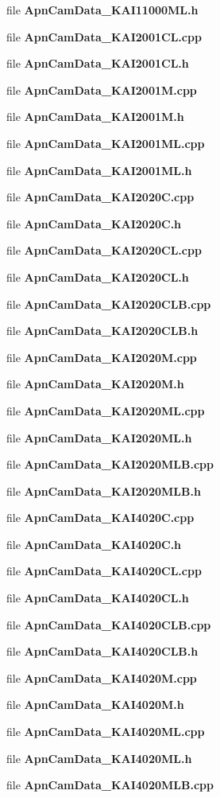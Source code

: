 \begin{CompactItemize}
file {\bf Apn\-Cam\-Data\_\-KAI11000ML.h}
\item 
file {\bf Apn\-Cam\-Data\_\-KAI2001CL.cpp}
\item 
file {\bf Apn\-Cam\-Data\_\-KAI2001CL.h}
\item 
file {\bf Apn\-Cam\-Data\_\-KAI2001M.cpp}
\item 
file {\bf Apn\-Cam\-Data\_\-KAI2001M.h}
\item 
file {\bf Apn\-Cam\-Data\_\-KAI2001ML.cpp}
\item 
file {\bf Apn\-Cam\-Data\_\-KAI2001ML.h}
\item 
file {\bf Apn\-Cam\-Data\_\-KAI2020C.cpp}
\item 
file {\bf Apn\-Cam\-Data\_\-KAI2020C.h}
\item 
file {\bf Apn\-Cam\-Data\_\-KAI2020CL.cpp}
\item 
file {\bf Apn\-Cam\-Data\_\-KAI2020CL.h}
\item 
file {\bf Apn\-Cam\-Data\_\-KAI2020CLB.cpp}
\item 
file {\bf Apn\-Cam\-Data\_\-KAI2020CLB.h}
\item 
file {\bf Apn\-Cam\-Data\_\-KAI2020M.cpp}
\item 
file {\bf Apn\-Cam\-Data\_\-KAI2020M.h}
\item 
file {\bf Apn\-Cam\-Data\_\-KAI2020ML.cpp}
\item 
file {\bf Apn\-Cam\-Data\_\-KAI2020ML.h}
\item 
file {\bf Apn\-Cam\-Data\_\-KAI2020MLB.cpp}
\item 
file {\bf Apn\-Cam\-Data\_\-KAI2020MLB.h}
\item 
file {\bf Apn\-Cam\-Data\_\-KAI4020C.cpp}
\item 
file {\bf Apn\-Cam\-Data\_\-KAI4020C.h}
\item 
file {\bf Apn\-Cam\-Data\_\-KAI4020CL.cpp}
\item 
file {\bf Apn\-Cam\-Data\_\-KAI4020CL.h}
\item 
file {\bf Apn\-Cam\-Data\_\-KAI4020CLB.cpp}
\item 
file {\bf Apn\-Cam\-Data\_\-KAI4020CLB.h}
\item 
file {\bf Apn\-Cam\-Data\_\-KAI4020M.cpp}
\item 
file {\bf Apn\-Cam\-Data\_\-KAI4020M.h}
\item 
file {\bf Apn\-Cam\-Data\_\-KAI4020ML.cpp}
\item 
file {\bf Apn\-Cam\-Data\_\-KAI4020ML.h}
\item 
file {\bf Apn\-Cam\-Data\_\-KAI4020MLB.cpp}

\end{CompactItemize}
